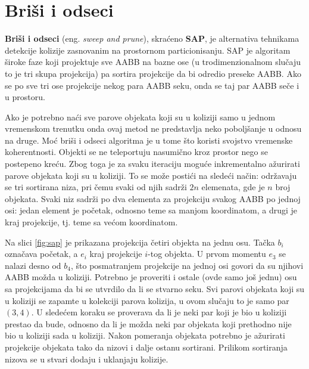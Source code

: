 \documentclass[12pt,oneside]{memoir}
\begin{document}
\section{Briši i odseci}
\label{subsec:sap}

\textbf{Briši i odseci} (eng. {\em sweep and prune}), skraćeno \textbf{SAP}, je alternativa tehnikama detekcije kolizije 
zasnovanim na prostornom particionisanju.
SAP je algoritam široke faze koji projektuje sve AABB
na bazne ose (u trodimenzionalnom slučaju to je tri skupa projekcija) pa sortira projekcije da bi odredio preseke AABB.
Ako se po sve tri ose projekcije nekog para AABB seku, onda se taj par AABB seče i u prostoru.

Ako je potrebno naći sve parove objekata koji su u koliziji samo u jednom vremenskom trenutku onda ovaj metod ne predstavlja neko poboljšanje u odnosu na druge.
Moć briši i odseci algoritma je u tome što koristi svojstvo vremenske koherentnosti.
Objekti se ne teleportuju nasumično kroz prostor nego se postepeno kreću. 
Zbog toga je za svaku iteraciju moguće inkrementalno ažurirati parove objekata koji su u koliziji.
To se može postići na sledeći način: održavaju se tri sortirana niza, pri čemu svaki od njih sadrži $2n$ elemenata, gde je $n$ broj objekata.
Svaki niz sadrži po dva elementa za projekciju svakog AABB po jednoj osi: jedan element je početak,
odnosno teme sa manjom koordinatom, a drugi je kraj projekcije, tj. teme sa većom koordinatom. 

Na slici \ref{fig:sap} je prikazana projekcija četiri objekta na jednu osu. 
Tačka $b_i$ označava početak, a $e_i$ kraj projekcije $i$-tog objekta.
U prvom momentu $e_3$ se nalazi desno od $b_4$, što posmatranjem projekcije na jednoj osi govori da su njihovi AABB možda u koliziji.
Potrebno je proveriti i ostale (ovde samo još jednu) osu sa projekcijama da bi se utvrdilo da li se stvarno seku.
Svi parovi objekata koji su u koliziji se zapamte u kolekciji parova kolizija, u ovom slučaju to je samo par $(3, 4)$.
U sledećem koraku se proverava da li je neki par koji je bio u koliziji prestao da bude, 
odnosno da li je možda neki par objekata koji prethodno nije bio u koliziji sada u koliziji.
Nakon pomeranja objekata potrebno je ažurirati projekcije objekata tako da nizovi i dalje ostanu sortirani.
Prilikom sortiranja nizova se u stvari dodaju i uklanjaju kolizije.
\end{document}
